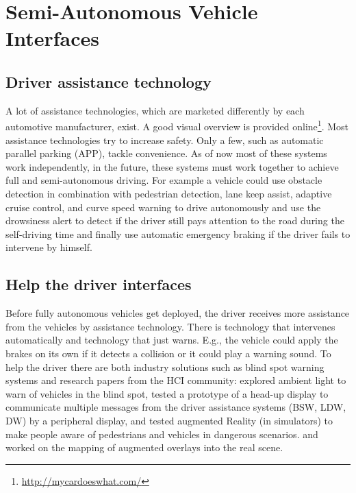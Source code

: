 \section{Semi-Autonomous Vehicle Interfaces}
\subsection{Driver assistance technology}
A lot of assistance technologies, which are marketed differently by each automotive manufacturer, exist. A good visual overview is provided online\footnote{\url{http://mycardoeswhat.com/}}. Most assistance technologies try to increase safety. Only a few, such as automatic parallel parking (APP), tackle convenience. As of now most of these systems work independently, in the future, these systems must work together to achieve full and semi-autonomous driving. For example a vehicle could use obstacle detection in combination with pedestrian detection, lane keep assist, adaptive cruise control, and curve speed warning to drive autonomously and use the drowsiness alert to detect if the driver still pays attention to the road during the self-driving time and finally use automatic emergency braking if the driver fails to intervene by himself. 

\subsection{Help the driver interfaces}
Before fully autonomous vehicles get deployed, the driver receives more assistance from the vehicles by assistance technology. There is technology that intervenes automatically and technology that just warns. E.g., the vehicle could apply the brakes on its own if it detects a collision or it could play a warning sound. To help the driver there are both industry solutions such as blind spot warning systems and research papers from the HCI community:  \cite{Loecken2015} explored ambient light to warn of vehicles in the blind spot, \cite{Langlois2013} tested a prototype of a head-up display to communicate multiple messages from the driver assistance systems (BSW, LDW, DW) by a peripheral display, \cite{Kim} and \cite{Langlois2016} tested augmented Reality (in simulators) to make people aware of pedestrians and vehicles in dangerous scenarios. 
\cite{Larnaout2013} and \cite{Abdi} worked on the mapping of augmented overlays into the real scene. 

